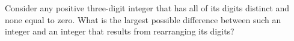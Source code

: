 Consider any positive three-digit integer that has all of its digits distinct and none equal to zero. What is the largest possible difference between such an integer and an integer that results from rearranging its digits?
